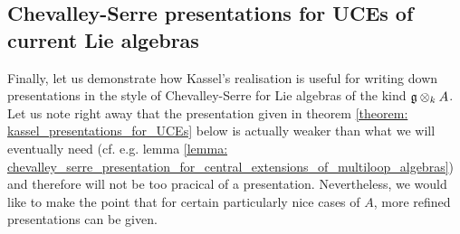    \subsection{Chevalley-Serre presentations for UCEs of current Lie algebras}
        Finally, let us demonstrate how Kassel's realisation is useful for writing down presentations in the style of Chevalley-Serre for Lie algebras of the kind $\g \tensor_k A$. Let us note right away that the presentation given in theorem \ref{theorem: kassel_presentations_for_UCEs} below is actually weaker than what we will eventually need (cf. e.g. lemma \ref{lemma: chevalley_serre_presentation_for_central_extensions_of_multiloop_algebras}) and therefore will not be too pracical of a presentation. Nevertheless, we would like to make the point that for certain particularly nice cases of $A$, more refined presentations can be given.


